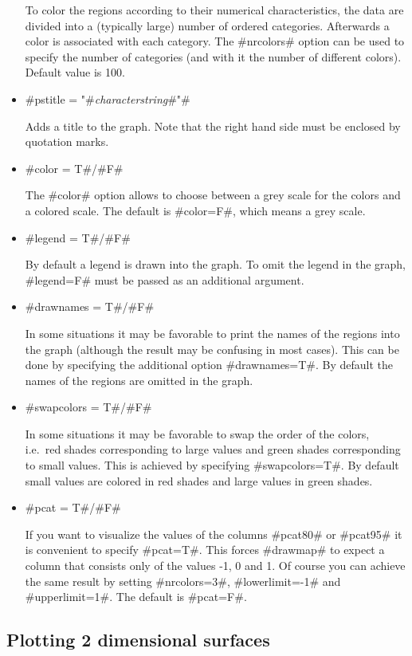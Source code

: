 \begin{itemize}
To color the regions according to their numerical characteristics,
the data are divided into a (typically large) number of ordered
categories. Afterwards a color is associated with each category.
The #nrcolors# option can be used to specify the number of
categories (and with it the number of different colors). Default
value is 100.

\item #pstitle = "#{\em characterstring}#"#

Adds a title to the graph. Note that the right hand side must be
enclosed by quotation marks.

\item #color = T#/#F#

The #color# option allows to choose between a grey scale for the
colors and a colored scale. The default is #color=F#, which means
a grey scale.

\item #legend = T#/#F#

By default a legend is drawn into the graph. To omit the legend in
the graph, #legend=F# must be passed as an additional argument.

\item #drawnames = T#/#F#

In some situations it may be favorable to print the names of the
regions into the graph (although the result may be confusing in
most cases). This can be done by specifying the additional option
#drawnames=T#. By default the names of the regions are omitted in
the graph.

\item #swapcolors = T#/#F#

In some situations it may be favorable to swap the order of the
colors, i.e.~red shades corresponding to large values and green
shades corresponding to small values. This is achieved by
specifying #swapcolors=T#. By default small values are colored in
red shades and large values in green shades.

\item #pcat = T#/#F#

If you want to visualize the values of the columns #pcat80# or
#pcat95# it is convenient to specify #pcat=T#. This forces
#drawmap# to expect a column that consists only of the values -1,
0 and 1. Of course you can achieve the same result by setting
#nrcolors=3#, #lowerlimit=-1# and #upperlimit=1#. The default is
#pcat=F#.
\end{itemize}

\subsection{Plotting 2 dimensional surfaces}
\label{splusplotsurf} 

